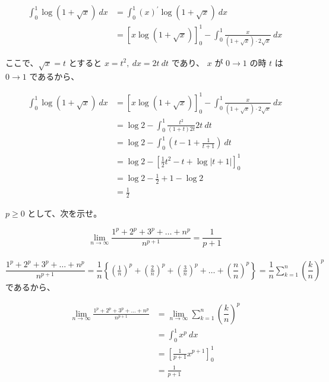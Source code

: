 \documentclass[a4j]{jsarticle}
\begin{document}
    \begin{align*}
        \int_{0}^{1} \log(1 + \sqrt{x}) \: dx &= \int_{0}^{1} (x)^{\prime} \log (1 + \sqrt{x}) \: dx \\
        &= \left[x \log (1 + \sqrt{x})\right]_{0}^{1} - \int_{0}^{1} \frac{x}{(1 + \sqrt{x}) \cdot 2\sqrt{x}} \: dx
    \end{align*}

    ここで、$\sqrt{x} = t$ とすると $x = t^2, \: dx = 2t \:dt$ であり、
    $x$ が $0 \rightarrow 1$ の時 $t$ は $0 \rightarrow 1$ であるから、
    
    \begin{align*}
        \int_{0}^{1} \log(1 + \sqrt{x}) \: dx &= \left[x \log (1 + \sqrt{x})\right]_{0}^{1} - \int_{0}^{1} \frac{x}{(1 + \sqrt{x}) \cdot 2\sqrt{x}} \: dx \\
        &= \log 2 - \int_{0}^{1} \frac{t^2}{(1 + t)2t}2t \: dt \\
        &= \log 2 - \int_{0}^{1} \left(t - 1 + \frac{1}{t + 1}\right) \: dt \\
        &= \log 2 - \left[\frac{1}{2} t^2 - t + \log \left|t + 1\right|\right]_{0}^{1} \\
        &= \log 2 - \frac{1}{2} + 1 - \log 2 \\
        &= \frac{1}{2}
    \end{align*}

    $p \geq 0$ として、次を示せ。

    \begin{equation*}
        \lim_{n \rightarrow \infty} \frac{1^p + 2^p + 3^p + \dots + n^p}{n^{p + 1}} = \frac{1}{p + 1}
    \end{equation*}
    \\

    $\displaystyle \dfrac{1^p + 2^p + 3^p + \dots + n^p}{n^{p + 1}} = \dfrac{1}{n} \left\{\left(\frac{1}{n}\right)^p + \left(\frac{2}{n}\right)^p + \left(\frac{3}{n}\right)^p + \dots + \left(\dfrac{n}{n}\right)^p \right\} = \dfrac{1}{n} \sum_{k = 1}^{n} \left(\dfrac{k}{n}\right)^p$ であるから、

    \begin{align*}
        \lim_{n \rightarrow \infty} \frac{1^p + 2^p + 3^p + \dots + n^p}{n^{p + 1}} &= \lim_{n \rightarrow \infty} \sum_{k = 1}^{n} \left(\dfrac{k}{n}\right)^p \\
        &= \int_{0}^{1} x^p \: dx \\
        &= \left[\frac{1}{p + 1} x^{p + 1}\right]_{0}^{1} \\
        &= \frac{1}{p + 1}
    \end{align*}
\end{document}
